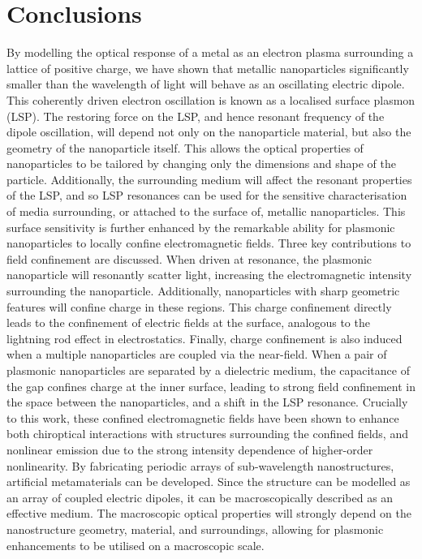 \section{Conclusions}

By modelling the optical response of a metal as an electron plasma surrounding a lattice of positive charge, we have shown that metallic nanoparticles significantly smaller than the wavelength of light will behave as an oscillating electric dipole. This coherently driven electron oscillation is known as a localised surface plasmon (LSP). The restoring force on the LSP, and hence resonant frequency of the dipole oscillation, will depend not only on the nanoparticle material, but also the geometry of the nanoparticle itself. This allows the optical properties of nanoparticles to be tailored by changing only the dimensions and shape of the particle. Additionally, the surrounding medium will affect the resonant properties of the LSP, and so LSP resonances can be used for the sensitive characterisation of media surrounding, or attached to the surface of, metallic nanoparticles.
This surface sensitivity is further enhanced by the remarkable ability for plasmonic nanoparticles to locally confine electromagnetic fields. Three key contributions to field confinement are discussed. When driven at resonance, the plasmonic nanoparticle will resonantly scatter light, increasing the electromagnetic intensity surrounding the nanoparticle. Additionally, nanoparticles with sharp geometric features will confine charge in these regions. This charge confinement directly leads to the confinement of electric fields at the surface, analogous to the lightning rod effect in electrostatics. Finally, charge confinement is also induced when a multiple nanoparticles are coupled via the near-field. When a pair of plasmonic nanoparticles are separated by a dielectric medium, the capacitance of the gap confines charge at the inner surface, leading to strong field confinement in the space between the nanoparticles, and a shift in the LSP resonance.
Crucially to this work, these confined electromagnetic fields have been shown to enhance both chiroptical interactions with structures surrounding the confined fields, and nonlinear emission due to the strong intensity dependence of higher-order nonlinearity. 
By fabricating periodic arrays of sub-wavelength nanostructures, artificial metamaterials can be developed. Since the structure can be modelled as an array of coupled electric dipoles, it can be macroscopically described as an effective medium. The macroscopic optical properties will strongly depend on the nanostructure geometry, material, and surroundings, allowing for plasmonic enhancements to be utilised on a macroscopic scale.
